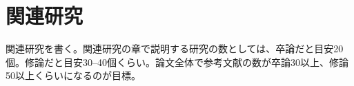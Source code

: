 \chapter{関連研究}
\label{chap:relwork}

関連研究を書く。関連研究の章で説明する研究の数としては、卒論だと目安20個。修論だと目安30--40個くらい。論文全体で参考文献の数が卒論30以上、修論50以上くらいになるのが目標。
